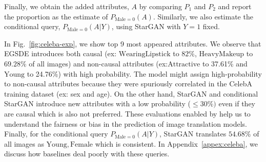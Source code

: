 \documentclass{article}
\newcommand{\idgen}{\text{ID-GEN}\xspace}
\newcommand{\WL}{\mathrm{WearingLipstick}\xspace}
\newcommand{\AT}{\mathrm{Attractive}\xspace}
\newcommand{\YO}{\mathrm{Young}\xspace}
\newcommand{\MA}{\mathrm{Male}\xspace}
\newcommand{\FE}{\mathrm{Female}\xspace}
\newcommand{\HM}{\mathrm{HeavyMakeup}\xspace}
\theoremstyle{plain}
\theoremstyle{definition}
\theoremstyle{remark}
\begin{document}
Finally, we obtain the added attributes, $A$  by comparing $P_1$ and $P_2$ and report the proportion as the estimate of $P_{\MA=0}(A)$.
Similarly, we also estimate the conditional query, $P_{\MA=0}(A|Y)$, using StarGAN with $Y=1$ fixed.
\par
In Fig.~\ref{fig:celeba-exp}, we show top 9 most appeared attributes.
%
%
We observe that EGSDE introduces both causal (ex: $\WL$  to $82\%$, $\HM$ to $69.28\%$ of all images) and non-causal attributes (ex:$\AT$ to 37.61\% and $\YO$ to 24.76\%) with high probability. 
%
%
The model might assign high-probability to non-causal attributes because they were spuriously correlated in the CelebA training dataset (ex: sex and age). 
%
On the other hand, StarGAN and conditional StarGAN introduce new attributes with a low probability ($\leq 30\%)$ even if they are causal which is also not preferred. 
These evaluations enabled by \idgen help us to understand the fairness or bias in 
the prediction of image translation models.
Finally, for the conditional query $P_{\MA=0}(A|Y)$,  StarGAN translates $54.68\%$ of all images as $\YO, \FE$ which 
is
consistent.
In Appendix~\ref{appex:celeba}, we discuss how baselines deal poorly with these queries.
%
%
%
%
%
%
%
		
%
%
\end{document}
